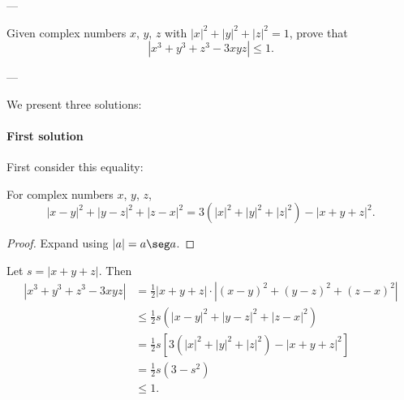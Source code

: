 
---

Given complex numbers $x$, $y$, $z$ with $|x|^2+|y|^2+|z|^2=1$, prove that \[\left\lvert x^3+y^3+z^3-3xyz\right\rvert\le1.\]

---

We present three solutions:

\paragraph{First solution} First consider this equality:
\begin{lemma*}
    For complex numbers $x$, $y$, $z$, \[|x-y|^2+|y-z|^2+|z-x|^2=3\left(|x|^2+|y|^2+|z|^2\right)-|x+y+z|^2.\]
\end{lemma*}
\begin{proof}
    Expand using $|a|=a\seg a$.
\end{proof}

Let $s=|x+y+z|$. Then
\begin{align*}
    \left\lvert x^3+y^3+z^3-3xyz\right\rvert&=\tfrac12|x+y+z|\cdot\left\lvert(x-y)^2+(y-z)^2+(z-x)^2\right\rvert\\
    &\le\tfrac12s\left(|x-y|^2+|y-z|^2+|z-x|^2\right)\\
    &=\tfrac12s\left[3\left(|x|^2+|y|^2+|z|^2\right)-|x+y+z|^2\right]\\
    &=\tfrac12s\left(3-s^2\right)\\
    &\le1.
\end{align*}

